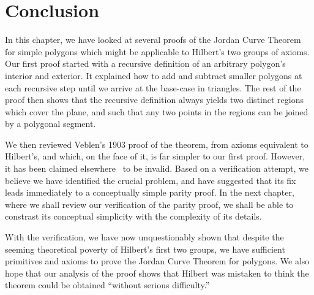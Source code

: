 \section{Conclusion}
In this chapter, we have looked at several proofs of the Jordan Curve Theorem for simple polygons which might be applicable to Hilbert's two groups of axioms. Our first proof started with a recursive definition of an arbitrary polygon's interior and exterior. It explained how to add and subtract smaller polygons at each recursive step until we arrive at the base-case in triangles. The rest of the proof then shows that the recursive definition always yields two distinct regions which cover the plane, and such that any two points in the regions can be joined by a polygonal segment.

We then reviewed Veblen's 1903 proof of the theorem, from axioms equivalent to Hilbert's, and which, on the face of it, is far simpler to our first proof. However, it has been claimed elsewhere~\cite{GuggenheimerJordanCurve,HahnInconclusiveIndirect} to be invalid. Based on a verification attempt, we believe we have identified the crucial problem, and have suggested that its fix leads immediately to a conceptually simple parity proof. In the next chapter, where we shall review our verification of the parity proof, we shall be able to constrast its conceptual simplicity with the complexity of its details. 

With the verification, we have now unquestionably shown that despite the seeming theoretical poverty of Hilbert's first two groups, we have sufficient primitives and axioms to prove the Jordan Curve Theorem for polygons. We also hope that our analysis of the proof shows that Hilbert was mistaken to think the theorem could be obtained ``without serious difficulty.''

